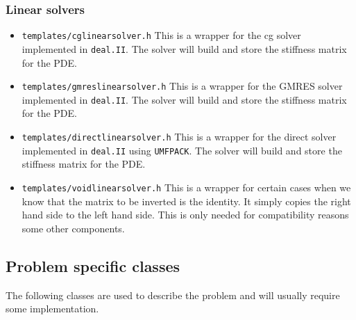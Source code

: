 \subsubsection{Linear solvers}
\begin{itemize}
\item \texttt{templates/cglinearsolver.h} This is a wrapper for the cg solver implemented in 
  \texttt{deal.II}. The solver will build and store the stiffness matrix for the PDE.
\item \texttt{templates/gmreslinearsolver.h} This is a wrapper for the GMRES solver 
  implemented in \texttt{deal.II}. The solver will build and store the stiffness matrix 
  for the PDE.
\item \texttt{templates/directlinearsolver.h} This is a wrapper for the direct solver 
  implemented in \texttt{deal.II} using \texttt{UMFPACK}. 
  The solver will build and store the stiffness matrix for the PDE.
\item \texttt{templates/voidlinearsolver.h} This is a wrapper for certain cases when we 
  know that the matrix to be inverted is the identity. It simply copies the right hand side to the
  left hand side. This is only needed for compatibility reasons some other components.
\end{itemize}



\subsection{Problem specific classes}
The following classes are used to describe the problem and will usually require 
some implementation.

